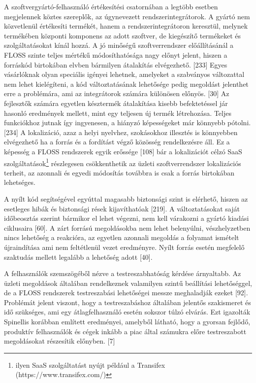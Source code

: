 \documentclass[12pt,magyar,a4paper,oneside]{scrreprt}
\begin{document}
A szoftvergyártó-felhasználó értékesítési csatornában a legtöbb esetben
megjelennek köztes szereplők, az úgynevezett rendszerintegrátorok. A
gyártó nem közvetlenül értékesíti termékét, hanem a rendszerintegrátoron
keresztül, melynek termékében központi komponens az adott szoftver, de
kiegészítő termékeket és szolgáltatásokat kínál hozzá. A jó minőségű
szoftverrendszer előállításánál a FLOSS szinte teljes mértékű
módosíthatósága nagy előnyt jelent, hiszen a forráskód birtokában elvben
bármilyen átalakítás elvégezhető. {[}233{]} Egyes vásárlóknak olyan
speciális igényei lehetnek, amelyeket a szabványos változattal nem lehet
kielégíteni, a kód változtatásának lehetősége pedig megoldást jelenthet
erre a problémára, ami az integrátorok számára különösen előnyös.
{[}30{]} Az fejlesztők számára egyetlen késztermék átalakítása kisebb
befektetéssel jár hasonló eredmények mellett, mint egy teljesen új
termék létrehozása. Teljes funkciókhoz jutnak így ingyenesen, a hiányzó
képességeket már könnyebb pótolni. {[}234{]} A lokalizáció, azaz a helyi
nyelvhez, szokásokhoz illesztés is könnyebben elvégezhető ha a forrás és
a fordítást végző közösség rendelkezésre áll. Ez a képesség a FLOSS
rendszerek egyik erőssége {[}108{]} bár a lokalizációt célzó SaaS
szolgáltatások\footnote{ilyen SaaS szolgáltatást nyújt például a
  Transifex (https://www.transifex.com/)} részlegesen csökkenthetik az
üzleti szoftverrendszer lokalizációs terheit, az azonnali és egyedi
módosítás továbbra is csak a forrás birtokában lehetséges.

A nyílt kód segítségével egyúttal magasabb biztonsági szint is elérhető,
hiszen az esetleges hibák és biztonsági rések kijavíthatóak {[}219{]}. A
változtatásokat saját időbeosztás szerint bármikor el lehet végezni, nem
kell várakozni a gyártó kiadási ciklusaira {[}60{]}. A zárt forrású
megoldásokba nem lehet belenyúlni, vészhelyzetben nincs lehetőség a
reakcióra, az egyetlen azonnali megoldás a folyamat ismételt
újraindítása ami nem feltétlenül vezet eredményre. Nyílt forrás esetén
megfelelő szaktudás mellett legalább a lehetőség adott {[}40{]}.

A felhasználók szemszögéből nézve a testreszabhatóság kérdése
árnyaltabb. Az üzleti megoldások általában rendelkeznek valamilyen
szintű beállítási lehetőséggel, de a FLOSS rendszerek testreszabási
lehetőségei messze meghaladják ezeket {[}92{]}. Problémát jelent
viszont, hogy a testreszabáshoz általában jelentős szakismeret és idő
szükséges, ami egy átlagfelhasználó esetén sokszor túlzó elvárás. Ezt
igazolták Spinellis korábban említett eredményei, amelyből látható, hogy
a gyorsan fejlődő, produktív felhasználók és cégek inkább a piac által
számukra előre testreszabott megoldásokat részesítik előnyben. {[}7{]}
\end{document}
